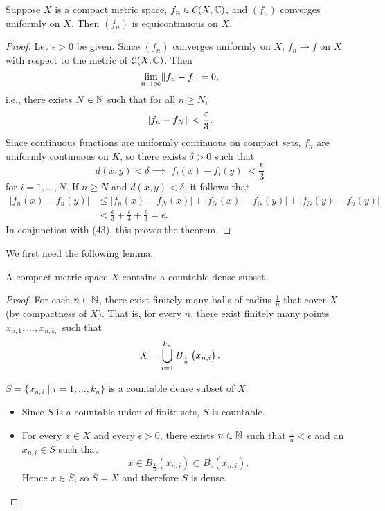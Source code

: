\begin{proposition}
Suppose $X$ is a compact metric space, $f_n\in\mathcal{C}(X,\mathbb C)$, and $(f_n)$ converges uniformly on $X$. Then $(f_n)$ is equicontinuous on $X$. 
\end{proposition}

\begin{proof}
Let $\epsilon>0$ be given. Since $(f_n)$ converges uniformly on $X$, $f_n\to f$ on $X$ with respect to the metric of $\mathcal{C}(X,\mathbb C)$. Then
\[\lim_{n\to\infty}\norm{f_n-f}=0,\]
i.e., there exists $N\in\mathbb N$ such that for all $n\ge N$,
\[\norm{f_n-f_N}<\frac{\varepsilon}{3}.\]
Since continuous functions are uniformly continuous on compact sets, $f_n$ are uniformly continuous on $K$, so there exists $\delta>0$ such that
\[d(x,y)<\delta\implies|f_i(x)-f_i(y)|<\frac{\epsilon}{3}\]
for $i=1,\dots,N$.
If $n\ge N$ and $d(x,y)<\delta$, it follows that
\begin{align*}
|f_n(x)-f_n(y)|
&\le|f_n(x)-f_N(x)|+|f_N(x)-f_N(y)|+|f_N(y)-f_n(y)|\\
&<\frac{\epsilon}{3}+\frac{\epsilon}{3}+\frac{\epsilon}{3}=\epsilon.
\end{align*}
In conjunction with (43), this proves the theorem.
\end{proof}

We first need the following lemma.

\begin{lemma}
A compact metric space $X$ contains a countable dense subset.
\end{lemma}

\begin{proof}
For each $n\in\mathbb N$, there exist finitely many balls of radius $\frac{1}{n}$ that cover $X$ (by compactness of $X$). That is, for every $n$, there exist finitely many points $x_{n,1},\dots,x_{n,k_n}$ such that
\[X=\bigcup_{i=1}^{k_n}B_\frac{1}{n}\left(x_{n,i}\right).\]
\begin{claim}
$S=\{x_{n,i}\mid i=1,\dots,k_n\}$ is a countable dense subset of $X$.
\end{claim}
\begin{itemize}
\item Since $S$ is a countable union of finite sets, $S$ is countable.
\item For every $x\in X$ and every $\epsilon>0$, there exists $n\in\mathbb N$ such that $\frac{1}{n}<\epsilon$ and an $x_{n,i}\in S$ such that
\[x\in B_\frac{1}{n}(x_{n,i})\subset B_\epsilon(x_{n,i}).\]
Hence $x\in\overline{S}$, so $\overline{S}=X$ and therefore $S$ is dense.
\end{itemize}
\end{proof}

